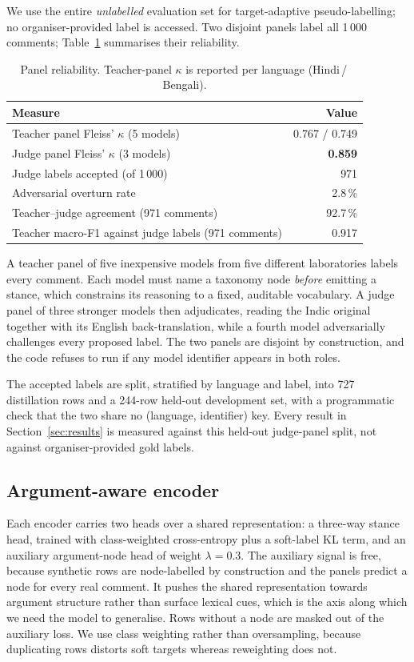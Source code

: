 \documentclass{ceurart}
\begin{document}
We use the entire \emph{unlabelled} evaluation set for target-adaptive
pseudo-labelling; no organiser-provided label is accessed. Two disjoint
panels label all 1\,000 comments;
Table~\ref{tab:panels} summarises their reliability.

\begin{table}[t]
\centering
\caption{Panel reliability. Teacher-panel $\kappa$ is reported per language
(Hindi\,/\,Bengali).}
\label{tab:panels}
\begin{tabular}{lr}
\toprule
Measure & Value \\
\midrule
Teacher panel Fleiss' $\kappa$ (5 models) & 0.767 / 0.749 \\
Judge panel Fleiss' $\kappa$ (3 models) & \textbf{0.859} \\
Judge labels accepted (of 1\,000) & 971 \\
Adversarial overturn rate & 2.8\,\% \\
Teacher--judge agreement (971 comments) & 92.7\,\% \\
Teacher macro-F1 against judge labels (971 comments) & 0.917 \\
\bottomrule
\end{tabular}
\end{table}

A teacher panel of five inexpensive models from five different laboratories
labels every comment. Each model must name a taxonomy node \emph{before}
emitting a stance, which constrains its reasoning to a fixed, auditable
vocabulary. A judge panel of three stronger models then adjudicates, reading
the Indic original together with its English back-translation, while a
fourth model adversarially challenges every proposed label. The two panels
are disjoint by construction, and the code refuses to run if any model
identifier appears in both roles.

The accepted labels are split, stratified by language and label, into 727
distillation rows and a 244-row held-out development set, with a
programmatic check that the two share no (language, identifier) key. Every result in
Section~\ref{sec:results} is measured against this held-out judge-panel
split, not against organiser-provided gold labels.

\subsection{Argument-aware encoder}
\label{sec:encoder}

Each encoder carries two heads over a shared representation: a three-way
stance head, trained with class-weighted cross-entropy plus a soft-label KL
term, and an auxiliary argument-node head of weight $\lambda = 0.3$. The
auxiliary signal is free, because synthetic rows are node-labelled by
construction and the panels predict a node for every real comment. It pushes
the shared representation towards argument structure rather than surface
lexical cues, which is the axis along which we need the model to generalise.
Rows without a node are masked out of the auxiliary loss. We use class
weighting rather than oversampling, because duplicating rows distorts soft
targets whereas reweighting does not.
\end{document}
